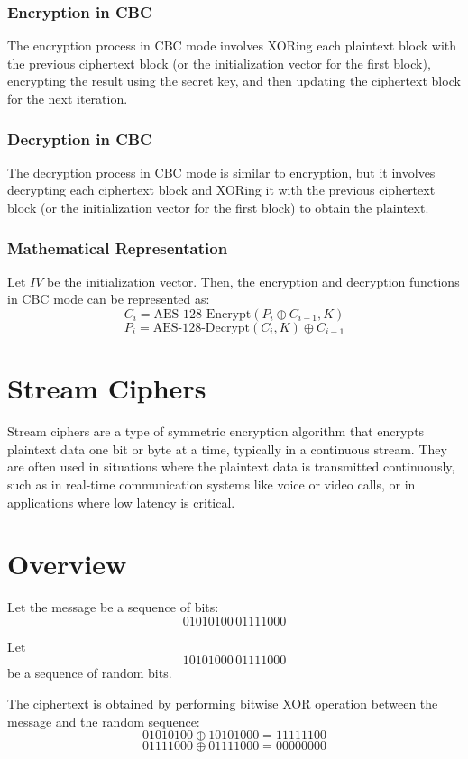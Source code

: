 \documentclass[11pt]{article}
\begin{document}
\subsubsection*{Encryption in CBC}
The encryption process in CBC mode involves XORing each plaintext block with the previous ciphertext block (or the initialization vector for the first block), encrypting the result using the secret key, and then updating the ciphertext block for the next iteration.

\subsubsection*{Decryption in CBC}
The decryption process in CBC mode is similar to encryption, but it involves decrypting each ciphertext block and XORing it with the previous ciphertext block (or the initialization vector for the first block) to obtain the plaintext.

\subsubsection*{Mathematical Representation}
Let \(IV\) be the initialization vector. Then, the encryption and decryption functions in CBC mode can be represented as:
\[ C_i = \text{AES-128-Encrypt}(P_i \oplus C_{i-1}, K) \]
\[ P_i = \text{AES-128-Decrypt}(C_i, K) \oplus C_{i-1} \]


\section*{Stream Ciphers}

Stream ciphers are a type of symmetric encryption algorithm that encrypts plaintext data one bit or byte at a time, typically in a continuous stream. They are often used in situations where the plaintext data is transmitted continuously, such as in real-time communication systems like voice or video calls, or in applications where low latency is critical.

\section*{Overview}

Let the message be a sequence of bits:
\[ 01010100 \, 01111000 \]

Let
\[ 10101000 \, 01111000 \]
be a sequence of random bits.

The ciphertext is obtained by performing bitwise XOR operation between the message and the random sequence:
\[ 01010100 \oplus 10101000 = 11111100 \]
\[ 01111000 \oplus 01111000 = 00000000 \]
\end{document}
